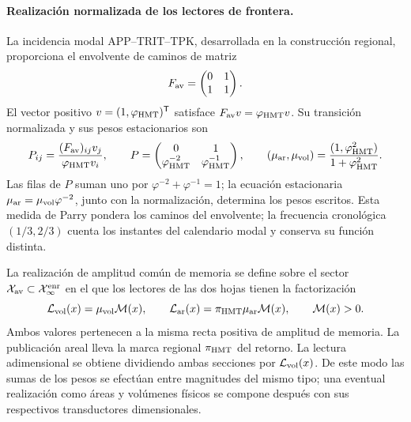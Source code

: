 \paragraph{Realización normalizada de los lectores de frontera.}
La incidencia modal APP--TRIT--TPK, desarrollada en la construcción
regional, proporciona el envolvente de caminos de matriz
\[
 F_{\rm av}=\begin{pmatrix}0&1\\1&1\end{pmatrix}.
\]
El vector positivo \(v=(1,\varphi_{\rm HMT})^{\mathsf T}\)
satisface \(F_{\rm av}v=\varphi_{\rm HMT}v\). Su transición
normalizada y sus pesos estacionarios son
\begin{equation}
 P_{ij}=\frac{(F_{\rm av})_{ij}v_j}{\varphi_{\rm HMT}v_i},
 \qquad
 P=\begin{pmatrix}0&1\\
 \varphi_{\rm HMT}^{-2}&\varphi_{\rm HMT}^{-1}\end{pmatrix},
 \qquad
 (\mu_{\rm ar},\mu_{\rm vol})
 =\frac{(1,\varphi_{\rm HMT}^{2})}{1+\varphi_{\rm HMT}^{2}}.
 \label{vii:vii:eq:lectores-parry}
\end{equation}
Las filas de \(P\) suman uno por
\(\varphi^{-2}+\varphi^{-1}=1\); la ecuación estacionaria
\(\mu_{\rm ar}=\mu_{\rm vol}\varphi^{-2}\), junto con la
normalización, determina los pesos escritos. Esta medida de Parry
pondera los caminos del envolvente; la frecuencia cronológica
\((1/3,2/3)\) cuenta los instantes del calendario modal y conserva
su función distinta.

La realización de amplitud común de memoria se define sobre el sector
\(\mathcal X_{\rm av}\subset\mathcal X_\infty^{\rm enr}\) en el que
los lectores de las dos hojas tienen la factorización
\begin{equation}
 \mathcal L_{\rm vol}(x)=\mu_{\rm vol}\mathcal M(x),\qquad
 \mathcal L_{\rm ar}(x)=\pi_{\rm HMT}\mu_{\rm ar}\mathcal M(x),
 \qquad \mathcal M(x)>0.
 \label{vii:vii:eq:lectores-amplitud-comun}
\end{equation}
Ambos valores pertenecen a la misma recta positiva de amplitud de
memoria. La publicación areal lleva la marca regional
\(\pi_{\rm HMT}\) del retorno. La lectura adimensional se obtiene
dividiendo ambas secciones por \(\mathcal L_{\rm vol}(x)\).
De este modo las sumas de los pesos se efectúan entre magnitudes del
mismo tipo; una eventual realización como áreas y volúmenes físicos
se compone después con sus respectivos transductores dimensionales.

